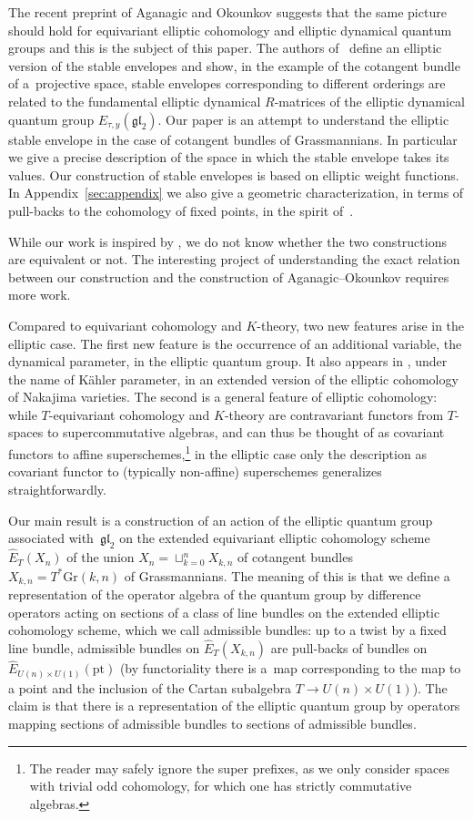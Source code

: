 \documentclass[pdftex]{sigma}
\numberwithin{equation}{section}
\begin{document}
The recent preprint \cite{AO} of Aganagic and Okounkov suggests that the same picture should hold for equivariant elliptic cohomology and elliptic dynamical quantum groups and this is the subject of this paper. The authors of~\cite{AO} define an elliptic version of the stable envelopes and show, in the example of the cotangent bundle of a~projective space, stable envelopes corresponding to different orderings are related to the fundamental elliptic dynamical $R$-matrices of the elliptic dynamical quantum group $E_{\tau,y}(\mathfrak{gl}_2)$. Our paper is an attempt to understand the elliptic stable envelope in the case of cotangent bundles of Grassmannians. In particular we give a precise description of the space in which the stable envelope takes its values. Our construction of stable envelopes is based on elliptic weight functions. In Appendix~\ref{sec:appendix} we also give a geometric characterization, in terms of pull-backs to the cohomology of fixed points, in the spirit of~\cite{MO}.

While our work is inspired by \cite{AO}, we do not know whether the two constructions are equivalent or not. The interesting project of understanding the exact relation between our construction and the construction of Aganagic--Okounkov requires more work.

Compared to equivariant cohomology and $K$-theory, two new features arise in the elliptic case. The first new feature is the occurrence of an additional variable, the dynamical parameter, in the elliptic quantum group. It also appears in \cite{AO}, under the name of K\"ahler parameter, in an extended version of the elliptic cohomology of Nakajima varieties. The second is a general feature of elliptic cohomology: while $T$-equivariant cohomology and $K$-theory are contravariant functors from $T$-spaces to supercommutative algebras, and can thus be thought of as covariant functors to affine superschemes,\footnote{The reader may safely ignore the super prefixes, as we only consider spaces with trivial odd cohomology, for which one has strictly commutative algebras.} in the elliptic case only the description as covariant functor to (typically non-affine) superschemes generalizes straightforwardly.

Our main result is a construction of an action of the elliptic quantum group associated with~$\mathfrak{gl}_2$ on the extended equivariant elliptic cohomology scheme $\hat E_T(X_{n})$ of the union $X_n=\sqcup_{k=0}^n X_{k,n}$ of cotangent bundles $X_{k,n}=T^*\mathrm{Gr}(k,n)$ of Grassmannians. The meaning of this is that we define a representation of the operator algebra of the quantum group by difference operators acting on sections of a class of line bundles on the extended elliptic cohomology scheme, which we call admissible bundles: up to a twist by a fixed line bundle, admissible bundles on $\hat E_T(X_{k,n})$ are pull-backs of bundles on $\hat E_{U(n)\times U(1)}(\mathrm{pt})$ (by functoriality there is a~map corresponding to the map to a point and the inclusion of the Cartan subalgebra $T\to U(n)\times U(1)$). The claim is that there is a representation of the elliptic quantum group by operators mapping sections of admissible bundles to sections of admissible bundles.
\end{document}
